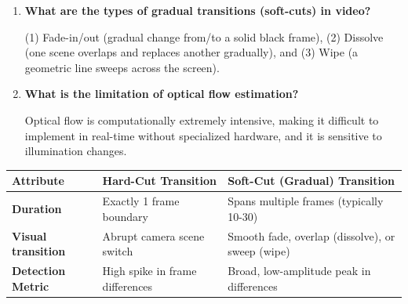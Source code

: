 \documentclass[12pt,a4paper]{article}
\newcommand{\Q}[1]{\textbf{#1}\par\noindent\ignorespaces}
\renewcommand{\arraystretch}{1.45}
\begin{document}
\begin{tcolorbox}[exambox, title={\textbf{Frequently Asked / Viva Questions}}]
\begin{enumerate}[leftmargin=*, itemsep=3.5pt, label=\arabic*.]
  \item \Q{What are the types of gradual transitions (soft-cuts) in video?} (1) Fade-in/out (gradual change from/to a solid black frame), (2) Dissolve (one scene overlaps and replaces another gradually), and (3) Wipe (a geometric line sweeps across the screen).
  \item \Q{What is the limitation of optical flow estimation?} Optical flow is computationally extremely intensive, making it difficult to implement in real-time without specialized hardware, and it is sensitive to illumination changes.
\end{enumerate}
\end{tcolorbox}

\begin{tcolorbox}[tikzbox, title={Hard-Cut vs. Soft-Cut Shot Boundaries}]
\centering
{\renewcommand{\arraystretch}{1.55}%
\begin{tabularx}{\linewidth}{|>{\bfseries}B{3.2cm}|Y|Y|}
\hline
Attribute & Hard-Cut Transition & Soft-Cut (Gradual) Transition \\
\hline
Duration & Exactly 1 frame boundary & Spans multiple frames (typically 10-30) \\
\hline
Visual transition & Abrupt camera scene switch & Smooth fade, overlap (dissolve), or sweep (wipe) \\
\hline
Detection Metric & High spike in frame differences & Broad, low-amplitude peak in differences \\
\hline
\end{tabularx}}
\end{tcolorbox}
\end{document}
